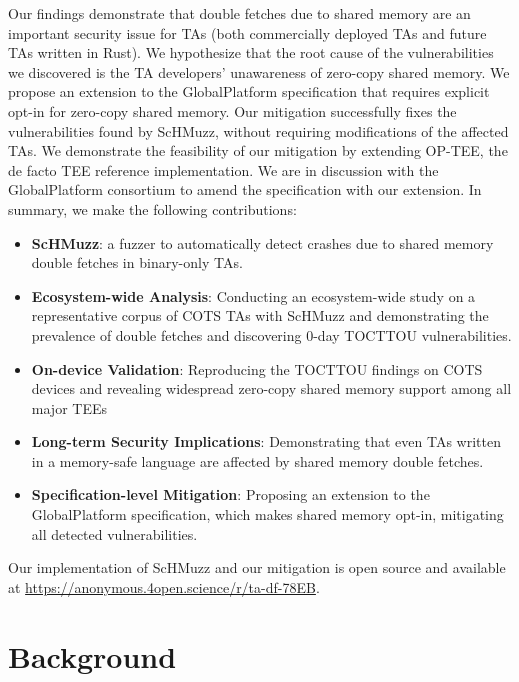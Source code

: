 \documentclass[conference]{IEEEtran}
\newcommand{\sysname}{ScHMuzz\xspace}
\newcommand{\optee}{OP-TEE\xspace}
\newcommand{\opensource}{\url{https://anonymous.4open.science/r/ta-df-78EB}\xspace}
\begin{document}
Our findings demonstrate that double fetches due to shared memory are an important 
security issue for TAs (both commercially deployed TAs and future TAs written in Rust). 
We hypothesize that the root cause of the vulnerabilities we discovered is the 
TA developers' unawareness of zero-copy shared memory. 
We propose an extension to the GlobalPlatform specification that requires explicit opt-in for 
zero-copy shared memory. Our mitigation successfully fixes the vulnerabilities found by \sysname, 
without requiring modifications of the affected TAs. We demonstrate the feasibility of our mitigation 
by extending \optee, the de facto TEE reference implementation. We are in discussion 
with the GlobalPlatform consortium to amend the specification with our extension.
In summary, we make the following contributions:


\begin{itemize}
    \item \textbf{\sysname}: a fuzzer to automatically detect crashes due to shared memory double fetches  
    in binary-only TAs.
    \item \textbf{Ecosystem-wide Analysis}: Conducting an ecosystem-wide study on a representative corpus of COTS TAs with \sysname 
    and demonstrating the prevalence of double fetches and discovering 0-day TOCTTOU 
    vulnerabilities.
    \item \textbf{On-device Validation}: Reproducing the TOCTTOU findings on COTS devices and revealing widespread 
    zero-copy shared memory support among all major TEEs
    \item \textbf{Long-term Security Implications}: Demonstrating that even TAs written in a memory-safe language are affected by shared memory 
    double fetches.
    \item \textbf{Specification-level Mitigation}: Proposing an extension to the GlobalPlatform specification, which makes shared memory 
    opt-in, mitigating all detected vulnerabilities.
\end{itemize}

Our implementation of \sysname and our mitigation is open source and available at \opensource.


\section{Background}\label{sec:background}
\end{document}
